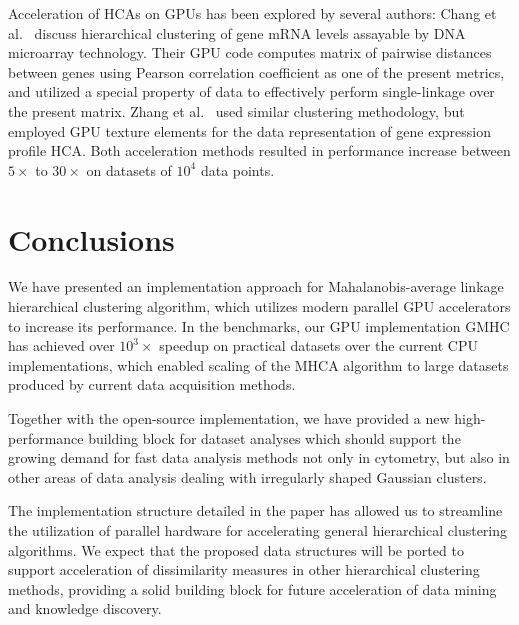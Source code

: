 Acceleration of HCAs on GPUs has been explored by several authors:
Chang et al.~\cite{chang2009hierarchical} discuss hierarchical clustering of gene mRNA levels assayable by DNA microarray technology.
Their GPU code computes matrix of pairwise distances between genes using Pearson correlation coefficient as one of the present metrics, and utilized a special property of data to effectively perform single-linkage over the present matrix.
Zhang et al.~\cite{zhang2006hierarchical} used similar clustering methodology, but employed GPU texture elements for the data representation of gene expression profile HCA.
Both acceleration methods resulted in performance increase between $5\times$ to $30\times$ on datasets of $10^4$ data points.


\section{Conclusions}\label{sec:conclusions}

We have presented an implementation approach for Mahalanobis-average linkage hierarchical clustering algorithm, which utilizes modern parallel GPU accelerators to increase its performance.
In the benchmarks, our GPU implementation GMHC has achieved over $10^3\times$ speedup on practical datasets over the current CPU implementations, which enabled scaling of the MHCA algorithm to large datasets produced by current data acquisition methods.

Together with the open-source implementation, we have provided a new high-performance building block for dataset analyses which should support the growing demand for fast data analysis methods not only in cytometry, but also in other areas of data analysis dealing with irregularly shaped Gaussian clusters.

The implementation structure detailed in the paper has allowed us to streamline the utilization of parallel hardware for accelerating general hierarchical clustering algorithms.
We expect that the proposed data structures will be ported to support acceleration of dissimilarity measures in other hierarchical clustering methods, providing a solid building block for future acceleration of data mining and knowledge discovery.




